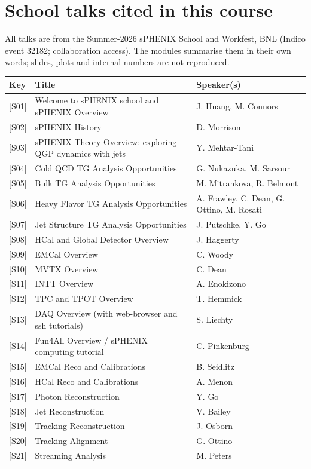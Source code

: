 \documentclass[11pt,letterpaper]{article}
\begin{document}
\section{School talks cited in this course}\label{sec:talks}
All talks are from the Summer-2026 sPHENIX School and Workfest, BNL (Indico event 32182; collaboration access). The modules summarise
them in their own words; slides, plots and internal numbers are not reproduced.
\begin{longtable}{@{}lp{9.3cm}p{4.2cm}@{}}\toprule Key & Title & Speaker(s)\\\midrule\endhead
{[S01]} & Welcome to sPHENIX school and sPHENIX Overview & J. Huang, M. Connors\\
{[S02]} & sPHENIX History & D. Morrison\\
{[S03]} & sPHENIX Theory Overview: exploring QGP dynamics with jets & Y. Mehtar-Tani\\
{[S04]} & Cold QCD TG Analysis Opportunities & G. Nukazuka, M. Sarsour\\
{[S05]} & Bulk TG Analysis Opportunities & M. Mitrankova, R. Belmont\\
{[S06]} & Heavy Flavor TG Analysis Opportunities & A. Frawley, C. Dean, G. Ottino, M. Rosati\\
{[S07]} & Jet Structure TG Analysis Opportunities & J. Putschke, Y. Go\\
{[S08]} & HCal and Global Detector Overview & J. Haggerty\\
{[S09]} & EMCal Overview & C. Woody\\
{[S10]} & MVTX Overview & C. Dean\\
{[S11]} & INTT Overview & A. Enokizono\\
{[S12]} & TPC and TPOT Overview & T. Hemmick\\
{[S13]} & DAQ Overview (with web-browser and ssh tutorials) & S. Liechty\\
{[S14]} & Fun4All Overview / sPHENIX computing tutorial & C. Pinkenburg\\
{[S15]} & EMCal Reco and Calibrations & B. Seidlitz\\
{[S16]} & HCal Reco and Calibrations & A. Menon\\
{[S17]} & Photon Reconstruction & Y. Go\\
{[S18]} & Jet Reconstruction & V. Bailey\\
{[S19]} & Tracking Reconstruction & J. Osborn\\
{[S20]} & Tracking Alignment & G. Ottino\\
{[S21]} & Streaming Analysis & M. Peters\\

\end{longtable}
\end{document}
